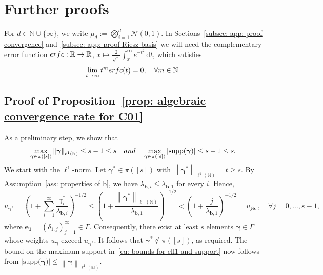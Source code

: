 \documentclass[namedate,webpdf]{ima-authoring-template-blank}
\newcommand*{\supp}{\mathrm{supp}}
\def\D{\,\mathrm{d}}
\newcommand*{\nm}[1]{{\left\|#1\right \|}}
\newcommand{\abs}[1]{\left|#1\right|}
\newcommand{\absd}[1]{|#1|}    %
\numberwithin{counter}{section}
\numberwithin{equation}{section}
\theoremstyle{plain}
\theoremstyle{definition}
\newcommand*{\cN}{\mathcal{N}}
\newcommand*{\bbN}{\mathbb{N}}
\newcommand*{\bbR}{\mathbb{R}}
\theoremstyle{thmstyletwo}
\begin{document}
\section{Further proofs}
\label{sec: app: further proofs}

For \( d \in \bbN \cup \{\infty \} \), we write \( \mu_d := \bigotimes_{i = 1}^d \cN(0,1) \). In Sections~\ref{subsec: app: proof convergence} and~\ref{subsec: app: proof Riesz basis} we will need the complementary error function 
\( \textup{erfc}: \bbR \to \bbR\), \(x \mapsto \frac{2}{\sqrt{\pi}} \int_x^{\infty} e^{-t^2} \D t\),
which satisfies
\begin{equation}
\label{eq: growth of erfc}
    \lim_{t \to \infty} t^m \textup{erfc}(t) = 0, \quad \forall m \in \bbN.
\end{equation}



\subsection{Proof of Proposition~\ref{prop: algebraic convergence rate for C01}}
\label{subsec: app: proof algebraic convergence}

As a preliminary step, we show that 
\begin{equation}
\label{eq: bounds for ell1 and support}
    \max_{\bm{\gamma} \in \pi([s])} \nm{\bm{\gamma}}_{\ell^1(\bbN)} \leq s - 1 \leq s
    \quad \textup{and} \quad 
    \max_{\bm{\gamma} \in \pi([s])} \abs{\supp(\bm{\gamma})} \leq s - 1 \leq s.
\end{equation}
We start with the \(\ell^1\)-norm. Let \( \bm{\gamma}^* \in \pi([s]) \) with \( \nm{\bm{\gamma}^*}_{\ell^1(\bbN)} = t \geq s \). By Assumption~\ref{ass: properties of b}, we have \( \lambda_{\bm{b}, i} \leq \lambda_{\bm{b}, 1} \) for every \(i\). Hence,
\[
u_{\bm{\gamma}^*} = \left( 1 + \sum_{i = 1}^{\infty} \frac{\gamma_i^*}{\lambda_{\bm{b}, i}} \right)^{-1/2}
\leq \left( 1 + \frac{\nm{\bm{\gamma^*}}_{\ell^1(\bbN)}}{\lambda_{\bm{b}, 1}} \right)^{-1/2}
< \left( 1 + \frac{j}{\lambda_{\bm{b}, 1}} \right)^{-1/2}
= u_{j \bm{e_1}}, \quad \forall j = 0, \dots, s-1,
\]
where \( \bm{e_1} = (\delta_{1,j})_{j = 1}^{\infty} \in \Gamma \). Consequently, there exist at least \(s\) elements \( \bm{\gamma} \in \Gamma \) whose weights \( u_{\bm{\gamma}} \) exceed \( u_{\bm{\gamma}^*} \). It follows that \( \bm{\gamma}^* \not\in \pi([s]) \), as required. 
The bound on the maximum support in~\eqref{eq: bounds for ell1 and support} now follows from \( \absd{\supp(\bm{\gamma)}} \leq \nm{\bm{\gamma}}_{\ell^1(\bbN)} \).
\end{document}

